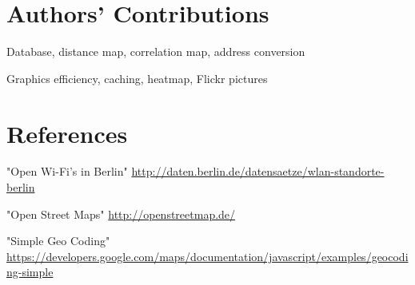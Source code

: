 \section*{Authors' Contributions}

\begin{description}
\setlength{\itemsep}{0pt}
  \item[Andreas Ergenzinger] Database, distance map, correlation map, address conversion
  \item[Josua Krause] Graphics efficiency, caching, heatmap, Flickr pictures
\end{description}

\section*{References}

\begin{description}
\setlength{\itemsep}{0pt}
\item[Wi-Fi Positions.] "Open Wi-Fi's in Berlin" 
  \url{http://daten.berlin.de/datensaetze/wlan-standorte-berlin}
\item[OSM.] "Open Street Maps" 
  \url{http://openstreetmap.de/}
\item[Google-Maps API.] "Simple Geo Coding"
  \url{https://developers.google.com/maps/documentation/javascript/examples/geocoding-simple} 
\end{description}
